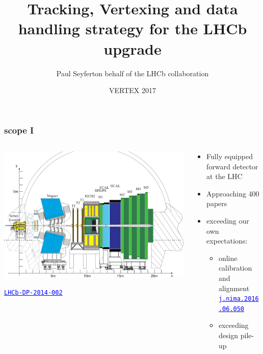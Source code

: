 \documentclass[table,xcolor=dvipsnames,professionalfonts]{beamer}
\author[Paul Seyfert]{Paul Seyfert\newline on behalf of the LHCb collaboration}
\institute[CERN]{CERN}
\date[\today]{VERTEX 2017}
\title[LHCb upgrade]{Tracking, Vertexing and data handling strategy for the LHCb upgrade}
\newcommand{\myhref}[2]{\href{#1}{\footnotesize{\textcolor{blue}{\texttt{#2}}}}}
\begin{document}
\maketitle

\begin{frame}
  \frametitle{scope I}

  \begin{columns}
    \begin{column}{.55\textwidth}
        \includegraphics[width=\textwidth,trim=0 0 0 50,clip]{LHCb-reoptimized-y.pdf}

        {\myhref{http://dx.doi.org/10.1142/S0217751X15300227}{LHCb-DP-2014-002}}
    \end{column}
    \begin{column}{.45\textwidth}
      \begin{itemize}
        \item Fully equipped forward detector at the LHC
        \item Approaching 400 papers
        \item exceeding our own expectations:
          \begin{itemize}
              \item online calibration and alignment
                \newline \myhref{http://dx.doi.org/10.1016/j.nima.2016.06.050}{j.nima.2016.06.050}
              \item exceeding design pile-up
          \end{itemize}
      \end{itemize}
    \end{column}
    \end{columns}
    \end{frame}
\end{document}
